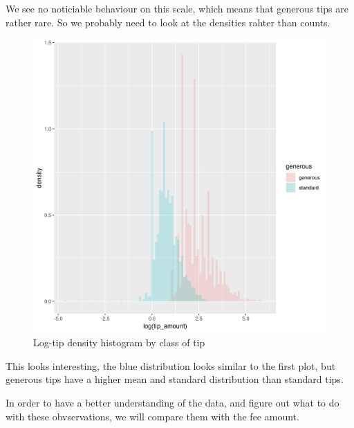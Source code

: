 \documentclass[11pt]{article}
\begin{document}
We see no noticiable behaviour on this scale, which means that generous tips are
rather rare. So we probably need to look at the densities rahter than counts.

\begin{figure}[htbp]
\centering
\includegraphics[width=.9\linewidth]{./plots/logTipGenerousFrequencyHist.jpg}
\caption{\label{fig:org91a8b09}
Log-tip density histogram by class of tip}
\end{figure}

This looks interesting, the blue distribution looks similar to the first plot,
but generous tips have a higher mean and standard distribution than standard
tips.

In order to have a better understanding of the data, and figure out what to do
with these obvservations, we will compare them with the fee amount.
\end{document}
